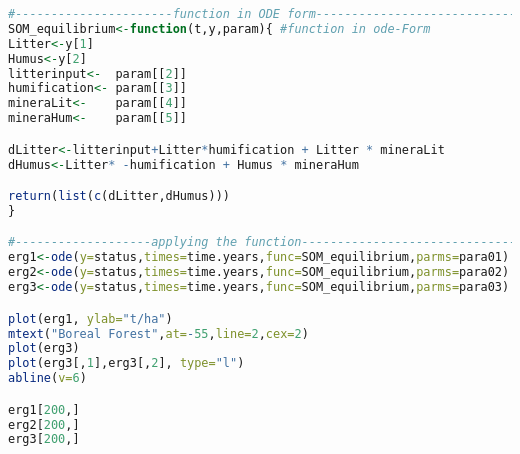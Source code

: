 \documentclass[10pt, a4paper]{article}
\begin{document}
\begin{lstlisting}[language=R]
#----------------------function in ODE form------------------------------
SOM_equilibrium<-function(t,y,param){ #function in ode-Form
Litter<-y[1]
Humus<-y[2]
litterinput<-  param[[2]]
humification<- param[[3]]
mineraLit<-    param[[4]]
mineraHum<-    param[[5]]

dLitter<-litterinput+Litter*humification + Litter * mineraLit
dHumus<-Litter* -humification + Humus * mineraHum

return(list(c(dLitter,dHumus)))
}

#-------------------applying the function---------------------------------
erg1<-ode(y=status,times=time.years,func=SOM_equilibrium,parms=para01)
erg2<-ode(y=status,times=time.years,func=SOM_equilibrium,parms=para02)
erg3<-ode(y=status,times=time.years,func=SOM_equilibrium,parms=para03)

plot(erg1, ylab="t/ha")
mtext("Boreal Forest",at=-55,line=2,cex=2)
plot(erg3)
plot(erg3[,1],erg3[,2], type="l")
abline(v=6)

erg1[200,]
erg2[200,]
erg3[200,]
\end{lstlisting}
\newpage
\end{document}
